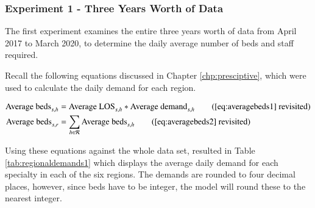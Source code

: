 \documentclass[../thesis.tex]{subfiles}
\begin{document}
\subsubsection{Experiment 1 - Three Years Worth of Data}
The first experiment examines the entire three years worth of data from April 2017 to March 2020, to determine the daily average number of beds and staff required.

Recall the following equations discussed in Chapter \ref{chp:presciptive}, which were used to calculate the daily demand for each region. 

\begin{align}
     \text{Average beds}_{s,h} &= \text{Average LOS}_{s,h} * \text{Average demand}_{s,h}\tag{\ref{eq:averagebeds1} revisited}\\
      \text{Average beds}_{s,r} &= \sum_{h \in \mathcal{R}} \text{Average beds}_{s,h} \tag{\ref{eq:averagebeds2} revisited}
\end{align}

Using these equations against the whole data set, resulted in Table \ref{tab:regionaldemands1} which displays the average daily demand for each specialty in each of the six regions. The demands are rounded to four decimal places, however, since beds have to be integer, the model will round these to the nearest integer.
\end{document}
